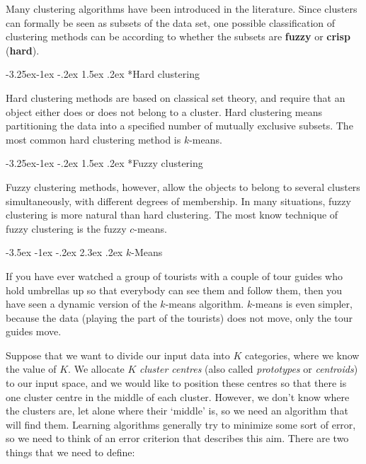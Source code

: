 \documentclass[]{book}
\makeatletter
\renewcommand\section{\@startsection {section}{1}{\z@}%
                                   {-3.5ex \@plus -1ex \@minus -.2ex}%
                                   {2.3ex \@plus.2ex}%
                                   {\normalfont\Large\bfseries\color{ForestGreen}}}
\renewcommand\subsection{\@startsection{subsection}{2}{\z@}%
                                     {-3.25ex\@plus -1ex \@minus -.2ex}%
                                     {1.5ex \@plus .2ex}%
                                     {\normalfont\large\bfseries\color{Violet}}}
\theoremstyle{definition}
\theoremstyle{definition}
\theoremstyle{definition}
\theoremstyle{remark}
\makeatother
\begin{document}
Many clustering algorithms have been introduced in the literature. Since
clusters can formally be seen as subsets of the data set, one possible
classification of clustering methods can be according to whether the
subsets are \textbf{fuzzy} or \textbf{crisp} (\textbf{hard}).

\subsection*{Hard clustering}\label{hard-clustering}

Hard clustering methods are based on classical set theory, and require
that an object either does or does not belong to a cluster. Hard
clustering means partitioning the data into a specified number of
mutually exclusive subsets. The most common hard clustering method is
\(k\)-means.

\subsection*{Fuzzy clustering}\label{fuzzy-clustering}

Fuzzy clustering methods, however, allow the objects to belong to
several clusters simultaneously, with different degrees of membership.
In many situations, fuzzy clustering is more natural than hard
clustering. The most know technique of fuzzy clustering is the fuzzy
\(c\)-means.

\section{\texorpdfstring{\(k\)-Means}{k-Means}}\label{k-means}

If you have ever watched a group of tourists with a couple of tour
guides who hold umbrellas up so that everybody can see them and follow
them, then you have seen a dynamic version of the \(k\)-means algorithm.
\(k\)-means is even simpler, because the data (playing the part of the
tourists) does not move, only the tour guides move.

Suppose that we want to divide our input data into \(K\) categories,
where we know the value of \(K\). We allocate \(K\) \emph{cluster
centres} (also called \emph{prototypes} or \emph{centroids}) to our
input space, and we would like to position these centres so that there
is one cluster centre in the middle of each cluster. However, we don't
know where the clusters are, let alone where their `middle' is, so we
need an algorithm that will find them. Learning algorithms generally try
to minimize some sort of error, so we need to think of an error
criterion that describes this aim. There are two things that we need to
define:
\end{document}
